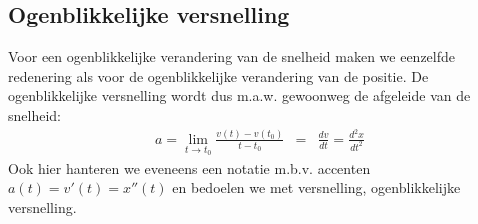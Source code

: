 \documentclass{ximera}
\begin{document}
	\subsection{Ogenblikkelijke versnelling}
	
	Voor een ogenblikkelijke verandering van de snelheid maken we eenzelfde redenering als voor de ogenblikkelijke verandering van de positie. De ogenblikkelijke versnelling wordt dus m.a.w. gewoonweg de afgeleide van de snelheid:
	\begin{eqnarray*}
	a=\lim_{t\to t_0}\frac{v(t)-v(t_0)}{t-t_0}&=&\frac{dv}{dt}=\frac{d^2x}{dt^2}
	\end{eqnarray*}
	Ook hier hanteren we eveneens een notatie m.b.v. accenten $a(t)=v'(t)=x''(t)$ en bedoelen we met versnelling, ogenblikkelijke versnelling.
	
	
	
\end{document}
